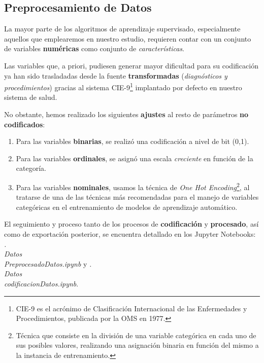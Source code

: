 

 \subsection{Preprocesamiento de Datos}

 La mayor parte de los algoritmos de aprendizaje supervisado, especialmente aquellos que emplearemos en nuestro estudio, requieren contar con un conjunto de variables \textbf{numéricas} como conjunto de \textit{características}.

 Las variables que, a priori, pudiesen generar mayor dificultad para su codificación ya han sido trasladadas desde la fuente \textbf{transformadas} (\textit{diagnósticos y procedimientos}) gracias al sistema CIE-9\footnote{CIE-9 es el acrónimo de Clasificación Internacional de las Enfermedades y Procedimientos, publicada por la OMS en 1977.} implantado por defecto en nuestro sistema de salud.

 No obstante, hemos realizado los siguientes \textbf{ajustes} al resto de parámetros \textbf{no codificados}:

 \begin{enumerate}
     \item Para las variables \textbf{binarias}, se realizó una codificación a nivel de bit (0,1).
     \item Para las variables \textbf{ordinales}, se asignó una escala \textit{creciente} en función de la categoría.
     \item Para las variables \textbf{nominales}, usamos la técnica de \textit{One Hot Encoding}\footnote{Técnica que consiste en la división de una variable categórica en cada uno de sus posibles valores, realizando una asignación binaria en función del mismo a la instancia de entrenamiento.}, al tratarse de una de las técnicas más recomendadas para el manejo de variables categóricas en el entrenamiento de modelos de aprendizaje automático\cite{Potdar2017AClassifiers}.
 \end{enumerate}


 El seguimiento y proceso tanto de los procesos de \textbf{codificación} y \textbf{procesado}, así como de exportación posterior, se encuentra detallado en los Jupyter Notebooks: \textit{.\\Datos\\PreprocesadoDatos.ipynb} y \textit{.\\Datos\\codificacionDatos.ipynb}.


